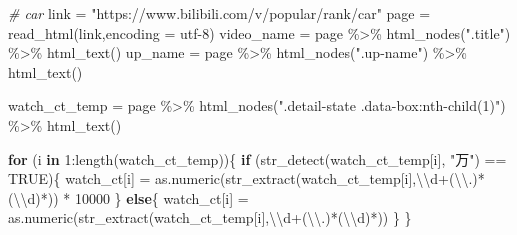 \documentclass[
]{article}
\newenvironment{Shaded}{\begin{snugshade}}{\end{snugshade}}
\newcommand{\AttributeTok}[1]{\textcolor[rgb]{0.77,0.63,0.00}{#1}}
\newcommand{\CommentTok}[1]{\textcolor[rgb]{0.56,0.35,0.01}{\textit{#1}}}
\newcommand{\ConstantTok}[1]{\textcolor[rgb]{0.00,0.00,0.00}{#1}}
\newcommand{\ControlFlowTok}[1]{\textcolor[rgb]{0.13,0.29,0.53}{\textbf{#1}}}
\newcommand{\DecValTok}[1]{\textcolor[rgb]{0.00,0.00,0.81}{#1}}
\newcommand{\FunctionTok}[1]{\textcolor[rgb]{0.00,0.00,0.00}{#1}}
\newcommand{\NormalTok}[1]{#1}
\newcommand{\OtherTok}[1]{\textcolor[rgb]{0.56,0.35,0.01}{#1}}
\newcommand{\SpecialCharTok}[1]{\textcolor[rgb]{0.00,0.00,0.00}{#1}}
\newcommand{\StringTok}[1]{\textcolor[rgb]{0.31,0.60,0.02}{#1}}
\begin{document}
\begin{Shaded}
\begin{Highlighting}[]
\CommentTok{\# car}
\NormalTok{link }\OtherTok{=} \StringTok{"https://www.bilibili.com/v/popular/rank/car"}
\NormalTok{page }\OtherTok{=} \FunctionTok{read\_html}\NormalTok{(link,}\AttributeTok{encoding =} \StringTok{\textquotesingle{}utf{-}8\textquotesingle{}}\NormalTok{)}
\NormalTok{video\_name }\OtherTok{=}\NormalTok{ page }\SpecialCharTok{\%\textgreater{}\%} \FunctionTok{html\_nodes}\NormalTok{(}\StringTok{".title"}\NormalTok{) }\SpecialCharTok{\%\textgreater{}\%} \FunctionTok{html\_text}\NormalTok{()}
\NormalTok{up\_name }\OtherTok{=}\NormalTok{ page }\SpecialCharTok{\%\textgreater{}\%} \FunctionTok{html\_nodes}\NormalTok{(}\StringTok{".up{-}name"}\NormalTok{) }\SpecialCharTok{\%\textgreater{}\%} \FunctionTok{html\_text}\NormalTok{()}

\NormalTok{watch\_ct\_temp }\OtherTok{=}\NormalTok{ page }\SpecialCharTok{\%\textgreater{}\%} \FunctionTok{html\_nodes}\NormalTok{(}\StringTok{".detail{-}state .data{-}box:nth{-}child(1)"}\NormalTok{) }\SpecialCharTok{\%\textgreater{}\%} \FunctionTok{html\_text}\NormalTok{()}

\ControlFlowTok{for}\NormalTok{ (i }\ControlFlowTok{in} \DecValTok{1}\SpecialCharTok{:}\FunctionTok{length}\NormalTok{(watch\_ct\_temp))\{}
  \ControlFlowTok{if}\NormalTok{ (}\FunctionTok{str\_detect}\NormalTok{(watch\_ct\_temp[i], }\StringTok{"万"}\NormalTok{) }\SpecialCharTok{==} \ConstantTok{TRUE}\NormalTok{)\{}
\NormalTok{    watch\_ct[i] }\OtherTok{=} \FunctionTok{as.numeric}\NormalTok{(}\FunctionTok{str\_extract}\NormalTok{(watch\_ct\_temp[i],}\StringTok{\textquotesingle{}}\SpecialCharTok{\textbackslash{}\textbackslash{}}\StringTok{d+(}\SpecialCharTok{\textbackslash{}\textbackslash{}}\StringTok{.)*(}\SpecialCharTok{\textbackslash{}\textbackslash{}}\StringTok{d)*\textquotesingle{}}\NormalTok{)) }\SpecialCharTok{*} \DecValTok{10000}
\NormalTok{  \}}
  \ControlFlowTok{else}\NormalTok{\{}
\NormalTok{    watch\_ct[i] }\OtherTok{=} \FunctionTok{as.numeric}\NormalTok{(}\FunctionTok{str\_extract}\NormalTok{(watch\_ct\_temp[i],}\StringTok{\textquotesingle{}}\SpecialCharTok{\textbackslash{}\textbackslash{}}\StringTok{d+(}\SpecialCharTok{\textbackslash{}\textbackslash{}}\StringTok{.)*(}\SpecialCharTok{\textbackslash{}\textbackslash{}}\StringTok{d)*\textquotesingle{}}\NormalTok{))}
\NormalTok{  \}}
\NormalTok{\}}



\end{Highlighting}
\end{Shaded}
\end{document}
